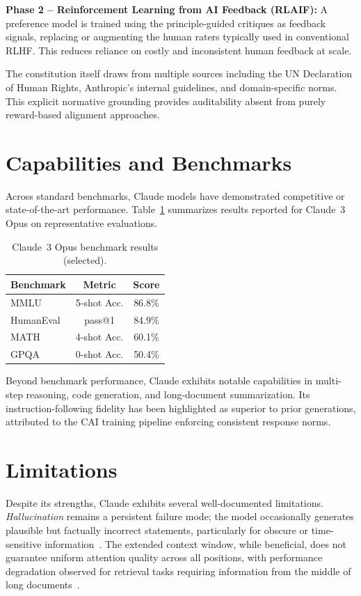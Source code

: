 \documentclass[10pt,twocolumn]{article}
\begin{document}
\textbf{Phase 2 -- Reinforcement Learning from AI Feedback (RLAIF):} A preference model is trained using the principle-guided critiques as feedback signals, replacing or augmenting the human raters typically used in conventional RLHF. This reduces reliance on costly and inconsistent human feedback at scale.

The constitution itself draws from multiple sources including the UN Declaration of Human Rights, Anthropic's internal guidelines, and domain-specific norms. This explicit normative grounding provides auditability absent from purely reward-based alignment approaches.

\section{Capabilities and Benchmarks}
\label{sec:capabilities}

Across standard benchmarks, Claude models have demonstrated competitive or state-of-the-art performance. Table~\ref{tab:benchmarks} summarizes results reported for Claude~3 Opus on representative evaluations.

\begin{table}[h]
\centering
\caption{Claude~3 Opus benchmark results (selected).}
\label{tab:benchmarks}
\begin{tabular}{lcc}
\toprule
\textbf{Benchmark} & \textbf{Metric} & \textbf{Score} \\
\midrule
MMLU             & 5-shot Acc.   & 86.8\% \\
HumanEval        & pass@1        & 84.9\% \\
MATH             & 4-shot Acc.   & 60.1\% \\
GPQA             & 0-shot Acc.   & 50.4\% \\
\bottomrule
\end{tabular}
\end{table}

Beyond benchmark performance, Claude exhibits notable capabilities in multi-step reasoning, code generation, and long-document summarization. Its instruction-following fidelity has been highlighted as superior to prior generations, attributed to the CAI training pipeline enforcing consistent response norms.

\section{Limitations}
\label{sec:limitations}

Despite its strengths, Claude exhibits several well-documented limitations. \textit{Hallucination} remains a persistent failure mode; the model occasionally generates plausible but factually incorrect statements, particularly for obscure or time-sensitive information~\cite{ji2023survey}. The extended context window, while beneficial, does not guarantee uniform attention quality across all positions, with performance degradation observed for retrieval tasks requiring information from the middle of long documents~\cite{liu2023lost}.
\end{document}

